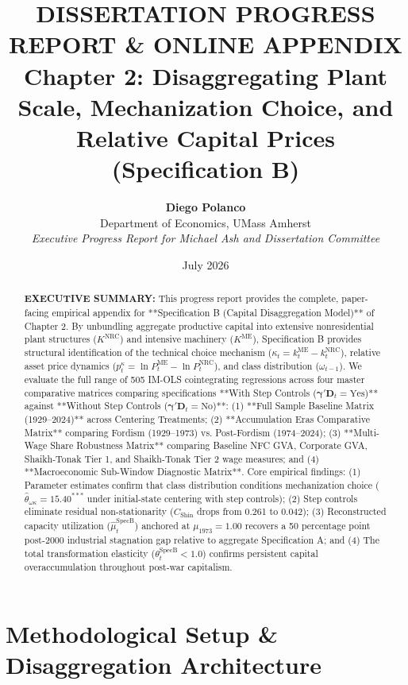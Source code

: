 \documentclass[11pt,a4paper]{article}
\title{\textbf{DISSERTATION PROGRESS REPORT \& ONLINE APPENDIX} \\[0.5em] \Large \textbf{Chapter 2: Disaggregating Plant Scale, Mechanization Choice, and Relative Capital Prices (Specification B)}}
\author{\textbf{Diego Polanco} \\ Department of Economics, UMass Amherst \\ \textit{Executive Progress Report for Michael Ash and Dissertation Committee}}
\date{July 2026}
\begin{document}
\maketitle

\begin{abstract}
\noindent \textbf{EXECUTIVE SUMMARY:} This progress report provides the complete, paper-facing empirical appendix for **Specification B (Capital Disaggregation Model)** of Chapter 2. By unbundling aggregate productive capital into extensive nonresidential plant structures ($K^{\text{NRC}}$) and intensive machinery ($K^{\text{ME}}$), Specification B provides structural identification of the technical choice mechanism ($\kappa_t = k^{\text{ME}}_t - k^{\text{NRC}}_t$), relative asset price dynamics ($p_t^{\kappa} = \ln P^{\text{ME}}_t - \ln P^{\text{NRC}}_t$), and class distribution ($\omega_{t-1}$). We evaluate the full range of 505 IM-OLS cointegrating regressions across four master comparative matrices comparing specifications **With Step Controls ($\boldsymbol{\gamma}'\mathbf{D}_t = \text{Yes}$)** against **Without Step Controls ($\boldsymbol{\gamma}'\mathbf{D}_t = \text{No}$)**: (1) **Full Sample Baseline Matrix (1929--2024)** across Centering Treatments; (2) **Accumulation Eras Comparative Matrix** comparing Fordism (1929--1973) vs. Post-Fordism (1974--2024); (3) **Multi-Wage Share Robustness Matrix** comparing Baseline NFC GVA, Corporate GVA, Shaikh-Tonak Tier 1, and Shaikh-Tonak Tier 2 wage measures; and (4) **Macroeconomic Sub-Window Diagnostic Matrix**. Core empirical findings: (1) Parameter estimates confirm that class distribution conditions mechanization choice ($\hat{\theta}_{\omega \kappa} = 15.40^{***}$ under initial-state centering with step controls); (2) Step controls eliminate residual non-stationarity ($C_{\text{Shin}}$ drops from 0.261 to 0.042); (3) Reconstructed capacity utilization ($\hat{\mu}_t^{\text{SpecB}}$) anchored at $\mu_{1973} = 1.00$ recovers a 50 percentage point post-2000 industrial stagnation gap relative to aggregate Specification A; and (4) The total transformation elasticity ($\theta_t^{\text{SpecB}} < 1.0$) confirms persistent capital overaccumulation throughout post-war capitalism.
\end{abstract}

\FloatBarrier
\section{Methodological Setup \& Disaggregation Architecture}
\end{document}
